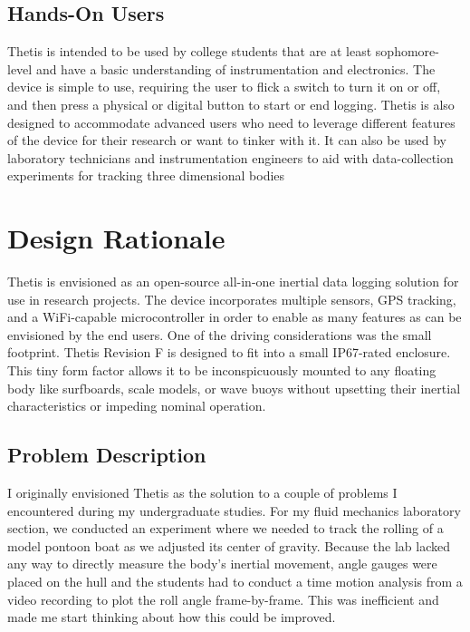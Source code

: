 \subsection{Hands-On Users} 
Thetis is intended to be used by college students that are at least sophomore-level and have a basic understanding of instrumentation and electronics.
The device is simple to use, requiring the user to flick a switch to turn it on or off, and then press a physical or digital button to start or end logging.
Thetis is also designed to accommodate advanced users who need to leverage different features of the device for their research or want to tinker with it.
It can also be used by laboratory technicians and instrumentation engineers to aid with data-collection experiments for tracking three dimensional bodies

\section{Design Rationale} 
Thetis is envisioned as an open-source all-in-one inertial data logging solution for use in research projects.
The device incorporates multiple sensors, GPS tracking, and a WiFi-capable microcontroller in order to enable as many features as can be envisioned by the end users.
One of the driving considerations was the small footprint.
Thetis Revision F is designed to fit into a small IP67-rated enclosure.  
This tiny form factor allows it to be inconspicuously mounted to any floating body like surfboards, scale models, or wave buoys without upsetting their inertial characteristics or impeding nominal operation.

\subsection{Problem Description} 
I originally envisioned Thetis as the solution to a couple of problems I encountered during my undergraduate studies.
For my fluid mechanics laboratory section, we conducted an experiment where we needed to track the rolling of a model pontoon boat as we adjusted its center of gravity.
Because the lab lacked any way to directly measure the body's inertial movement, angle gauges were placed on the hull and the students had to conduct a time motion analysis from a video recording to plot the roll angle frame-by-frame.
This was inefficient and made me start thinking about how this could be improved.

